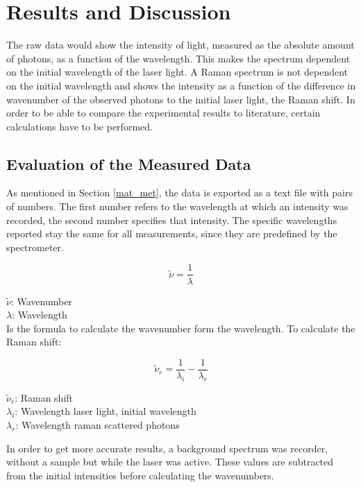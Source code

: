 \section{Results and Discussion}
The raw data would show the intensity of light, measured as the absolute amount of photons, as a function of the wavelength. This makes the spectrum dependent on the initial wavelength of the laser light. A Raman spectrum is not dependent on the initial wavelength and shows the intensity as a function of the difference in wavenumber of the observed photons to the initial laser light, the Raman shift. In order to be able to compare the experimental results to literature, certain calculations have to be performed.

\subsection{Evaluation of the Measured Data}

As mentioned in Section \ref{mat_met}, the data is exported as a text file with pairs of numbers. The first number refers to the wavelength at which an intensity was recorded, the second number specifies that intensity. The specific wavelengths reported stay the same for all measurements, since they are predefined by the spectrometer.


\begin{equation}
     \widetilde{\nu} = \frac{1}{\lambda}
\end{equation}

\(\widetilde{\nu}\): Wavenumber\\
\(\lambda\): Wavelength\\

Is the formula to calculate the wavenumber form the wavelength. To calculate the Raman shift:

\begin{equation} \label{eq:1}
     \widetilde{\nu}_r = \frac{1}{\lambda_i} - \frac{1}{\lambda_r}
\end{equation}

\(\widetilde{\nu}_r\): Raman shift\\
\(\lambda_i\): Wavelength laser light, initial wavelength\\
\(\lambda_r\): Wavelength raman scattered photons

\bigskip

In order to get more accurate results, a background spectrum was recorder, without a sample but while the laser was active. These values are subtracted from the initial intensities before calculating the wavenumbers. 

